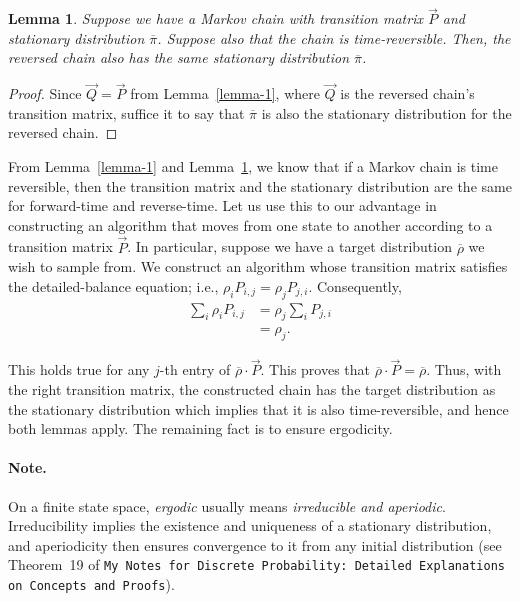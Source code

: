 \documentclass[12pt,a4paper]{article}
\newtheorem{lemma}[theorem]{Lemma}
\begin{document}
	\begin{lemma}
		Suppose we have a Markov chain with transition matrix \(\vec{P}\) and stationary distribution \(\overline{\pi}\). Suppose also that the chain is time-reversible. Then, the reversed chain also has the same stationary distribution \(\overline{\pi}\).
		\label{time-reverse-lemma}
	\end{lemma}
	\begin{proof}
		Since \(\vec{Q} = \vec{P}\) from Lemma~\ref{lemma-1}, where \(\vec{Q}\) is the reversed chain's transition matrix, suffice it to say that \(\overline{\pi}\) is also the stationary distribution for the reversed chain.
	\end{proof}
	
	From Lemma~\ref{lemma-1} and Lemma~\ref{time-reverse-lemma}, we know that if a Markov chain is time reversible, then the transition matrix and the stationary distribution are the same for forward-time and reverse-time. Let us use this to our advantage in constructing an algorithm that moves from one state to another according to a transition matrix \(\vec{P}\). In particular, suppose we have a target distribution \(\overline{\rho}\) we wish to sample from. We construct an algorithm whose transition matrix satisfies the detailed-balance equation; i.e., \(\rho_iP_{i,j} = \rho_jP_{j,i}\). Consequently, 
	\begin{align*} 
		\sum_i\rho_iP_{i,j} &= \rho_j\sum_i P_{j,i}\\ 
		&= \rho_j. 
	\end{align*} 
	
	This holds true for any \(j\)-th entry of \(\overline{\rho}\cdot\vec{P}\). This proves that \(\overline{\rho}\cdot\vec{P} = \overline{\rho}\). Thus, with the right transition matrix, the constructed chain has the target distribution as the stationary distribution which implies that it is also time-reversible, and hence both lemmas apply. The remaining fact is to ensure ergodicity.
	
	\paragraph{Note.} On a finite state space, \emph{ergodic} usually means \emph{irreducible and aperiodic}.
	Irreducibility implies the existence and uniqueness of a stationary distribution, and aperiodicity then ensures convergence to it from any initial distribution
	(see Theorem~19 of \texttt{My Notes for Discrete Probability: Detailed Explanations on Concepts and Proofs}).
	
\end{document}
